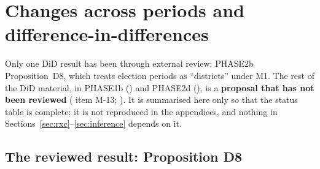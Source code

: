 \section{Changes across periods and difference-in-differences}\label{sec:did}

Only one DiD result has been through external review: PHASE2b Proposition~D8,
which treats election periods as ``districts'' under M1. The rest of the DiD
material, in PHASE1b () and PHASE2d
(), is a \textbf{proposal that has not been reviewed}
( item M-13; ).
It is summarised here only so that the status table is complete; it is not
reproduced in the appendices, and nothing in Sections~\ref{sec:rxc}--\ref{sec:inference}
depends on it.

\subsection{The reviewed result: Proposition D8}

